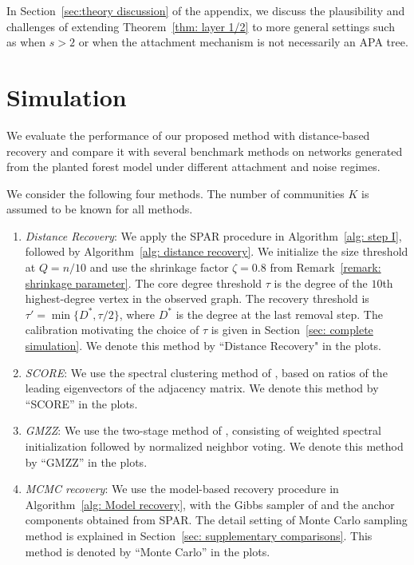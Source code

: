 \documentclass[twoside,11pt]{article}
\theoremstyle{remark}
\begin{document}
In Section~\ref{sec:theory discussion} of the appendix, we discuss the plausibility and challenges of extending Theorem~\ref{thm: layer 1/2} to more general settings such as when $s > 2$ or when the attachment mechanism is not necessarily an APA tree. 


\section{Simulation}
\label{sec: simulation}
We evaluate the performance of our proposed method with distance-based recovery and compare it with several benchmark methods on networks generated from the planted forest model under different attachment and noise regimes. 

We consider the following four methods. The number of communities $K$ is assumed to be known for all methods.
\begin{enumerate}
    \item \textit{Distance Recovery}: We apply the SPAR procedure in Algorithm~\ref{alg: step I}, followed by Algorithm~\ref{alg: distance recovery}. We initialize the size threshold at $Q=n/10$ and use the shrinkage factor $\zeta=0.8$ from Remark~\ref{remark: shrinkage parameter}. The core degree threshold $\tau$ is the degree of the $10$th highest-degree vertex in the observed graph. The recovery threshold is $\tau'=\min\{D^*,\tau/2\}$, where $D^*$ is the degree at the last removal step. 
    The calibration motivating the choice of $\tau$ is given in Section~\ref{sec: complete simulation}. We denote this method by ``Distance Recovery" in the plots.

    \item \textit{SCORE}: We use the spectral clustering method of \cite{jin2015fast}, based on ratios of the leading eigenvectors of the adjacency matrix. We denote this method by ``SCORE'' in the plots.

    \item \textit{GMZZ}: We use the two-stage method of \cite{gao2018community}, consisting of weighted spectral initialization followed by normalized neighbor voting. We denote this method by ``GMZZ'' in the plots.

    \item \textit{MCMC recovery}: We use the model-based recovery procedure in Algorithm~\ref{alg: Model recovery}, with the Gibbs sampler of \cite{crane2024root} and the anchor components obtained from SPAR.
    The detail setting of Monte Carlo sampling method is explained in Section~\ref{sec: supplementary comparisons}.
    This method is denoted by ``Monte Carlo'' in the plots. 
\end{enumerate}
\end{document}
